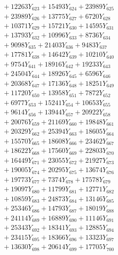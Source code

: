 \documentclass[a4paper,10pt]{article}
\begin{document}
{\begin{align}
&\;  + 12263 Y_{623} + 15493 Y_{624} + 23989 Y_{625} \\[0.3ex]
&\;  + 23989 Y_{626} + 13775 Y_{627} + 6720 Y_{628} \\[0.5ex]\allowbreak
&\;  + 10371 Y_{629} + 15721 Y_{630} + 14595 Y_{631} \\[0.3ex]
&\;  + 13793 Y_{632} + 10996 Y_{633} + 8736 Y_{634} \\[0.3ex]
&\;  + 9098 Y_{635} + 21403 Y_{636} + 9483 Y_{637} \\[0.3ex]
&\;  + 17781 Y_{638} + 14642 Y_{639} + 10210 Y_{640} \\[0.3ex]
&\;  + 9754 Y_{641} + 18916 Y_{642} + 19233 Y_{643} \\[0.3ex]
&\;  + 24504 Y_{644} + 18926 Y_{645} + 6596 Y_{646} \\[0.3ex]
&\;  + 20368 Y_{647} + 17136 Y_{648} + 18251 Y_{649} \\[0.3ex]
&\;  + 11720 Y_{650} + 13958 Y_{651} + 7872 Y_{652} \\[0.3ex]
&\;  + 6977 Y_{653} + 15241 Y_{654} + 10653 Y_{655} \\[0.3ex]
&\;  + 9614 Y_{656} + 13944 Y_{657} + 20922 Y_{658} \\[0.5ex]\allowbreak
&\;  + 20076 Y_{659} + 21169 Y_{660} + 19848 Y_{661} \\[0.3ex]
&\;  + 20329 Y_{662} + 25394 Y_{663} + 18605 Y_{664} \\[0.3ex]
&\;  + 15570 Y_{665} + 18608 Y_{666} + 23462 Y_{667} \\[0.3ex]
&\;  + 18622 Y_{668} + 17560 Y_{669} + 22803 Y_{670} \\[0.3ex]
&\;  + 16449 Y_{671} + 23055 Y_{672} + 21927 Y_{673} \\[0.3ex]
&\;  + 19005 Y_{674} + 20295 Y_{675} + 13674 Y_{676} \\[0.3ex]
&\;  + 19773 Y_{677} + 7374 Y_{678} + 17578 Y_{679} \\[0.3ex]
&\;  + 19097 Y_{680} + 11799 Y_{681} + 12771 Y_{682} \\[0.3ex]
&\;  + 10859 Y_{683} + 24873 Y_{684} + 13146 Y_{685} \\[0.3ex]
&\;  + 25346 Y_{686} + 14793 Y_{687} + 18019 Y_{688} \\[0.5ex]\allowbreak
&\;  + 24114 Y_{689} + 16889 Y_{690} + 11146 Y_{691} \\[0.3ex]
&\;  + 25343 Y_{692} + 18341 Y_{693} + 12885 Y_{694} \\[0.3ex]
&\;  + 23415 Y_{695} + 18366 Y_{696} + 13323 Y_{697} \\[0.3ex]
&\;  + 13630 Y_{698} + 20614 Y_{699} + 17705 Y_{700} \\[0.3ex]

\end{align}}
\end{document}
